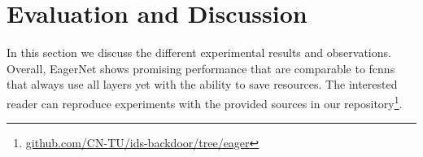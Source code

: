 \documentclass[conference]{IEEEtran}
\begin{document}
%



\section{Evaluation and Discussion}
\label{evaluation_and_discussion}
In this section we discuss the different experimental results and observations. Overall, EagerNet shows promising performance that are comparable to \glspl{fcnn} that always use all layers yet with the ability to save resources. The interested reader can reproduce experiments with the provided sources in our repository\footnote{\url{github.com/CN-TU/ids-backdoor/tree/eager}}.
\end{document}
